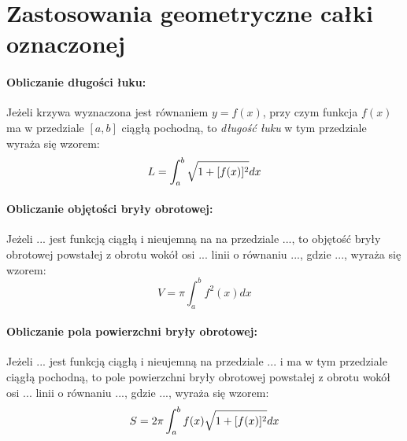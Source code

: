 \documentclass[a4paper,12pt]{book}
\begin{document}
     

\section*{Zastosowania geometryczne całki oznaczonej} 


\paragraph{Obliczanie długości łuku:}
Jeżeli krzywa wyznaczona jest równaniem $y=f(x)$, przy czym \mbox{funkcja}
$f(x)$ ma w przedziale $[a,b]$ ciągłą pochodną, to {\em długość łuku} w tym
przedziale wyraża się wzorem: $$L = \int_{a}^{b} \sqrt{\strut 1+ [  f(x) ]^{2}} dx$$


\paragraph{Obliczanie objętości bryły obrotowej:}
Jeżeli $...$ jest funkcją ciągłą i nieujemną na na przedziale $...$, to
objętość bryły obrotowej powstałej z obrotu wokół osi $...$ linii o równaniu
$...$, gdzie $...$, wyraża się wzorem:
$$V = \pi \int_{a}^{b}  f^{2}(x) dx$$


\paragraph{Obliczanie pola powierzchni bryły obrotowej:}
Jeżeli $...$ jest funkcją ciągłą i nieujemną na przedziale $...$ i ma w
tym przedziale ciągłą pochodną, to pole powierzchni bryły obrotowej powstałej z
obrotu wokół osi $...$ linii o równaniu  $...$, gdzie $...$, wyraża się
wzorem:
$$S = 2\pi \int_{a}^{b}  f(x)\sqrt{\strut 1+ [  f(x) ]^{2}} dx$$
\end{document}
